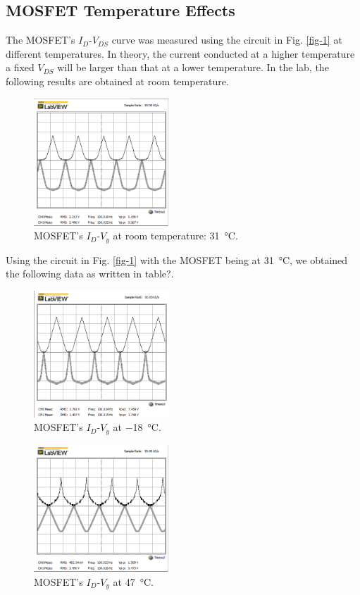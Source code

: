 \documentclass[journal]{IEEEtran}
\begin{document}
\subsection{MOSFET Temperature Effects}
\par The MOSFET’s $I_{D}$-$V_{DS}$ curve was measured using the circuit in Fig. \ref{fig-1}
at different temperatures. In theory, the current conducted at a higher temperature
a fixed $V_{DS}$ will be larger than that at a lower temperature. In the lab, the
following results are obtained at room temperature.
\begin{figure}[h]
  \centering
  \includegraphics[width=0.45\textwidth]{images/2-1.png}
  \caption{MOSFET’s $I_{D}$-$V_{y}$ at room temperature: \SI{31}{\celsius}.}
  \label{fig-5}
\end{figure}
\par Using the circuit in  Fig. \ref{fig-1} with the MOSFET being at \SI{31}{\celsius},
we obtained the following data as written in table?.
\begin{figure}[h]
  \centering
  \includegraphics[width=0.45\textwidth]{images/2-2.png}
  \caption{MOSFET’s $I_{D}$-$V_{y}$ at \SI{-18}{\celsius}.}
  \label{fig-6}
\end{figure}
\begin{figure}[h]
  \centering
  \includegraphics[width=0.45\textwidth]{images/2-3.png}
  \caption{MOSFET’s $I_{D}$-$V_{y}$ at \SI{47}{\celsius}.}
  \label{fig-6}
\end{figure}
\end{document}
